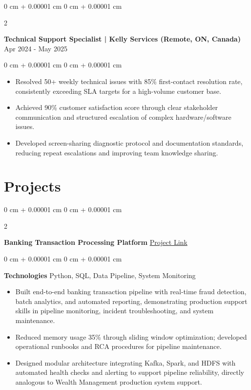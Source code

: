 \documentclass[10pt, letterpaper]{article}
\newenvironment{highlights}{
    \begin{itemize}[
        topsep=0.10 cm,
        parsep=0.10 cm,
        partopsep=0pt,
        itemsep=0pt,
        leftmargin=0 cm + 10pt
    ]
}{
    \end{itemize}
} %
\newenvironment{onecolentry}{
    \begin{adjustwidth}{
        0 cm + 0.00001 cm
    }{
        0 cm + 0.00001 cm
    }
}{
    \end{adjustwidth}
} %
\newenvironment{twocolentry}[2][]{
    \onecolentry
    \def\secondColumn{#2}
    \setcolumnwidth{\fill, 4.5 cm}
    \begin{paracol}{2}
}{
    \switchcolumn \raggedleft \secondColumn
    \end{paracol}
    \endonecolentry
} %
\begin{document}
        \begin{twocolentry}{
            {Apr 2024 - May 2025}
        }
            \textbf{Technical Support Specialist | Kelly Services (Remote, ON, Canada)}\end{twocolentry}
        \vspace{0.10 cm}
        \begin{onecolentry}
            \begin{highlights}
                \item Resolved 50+ weekly technical issues with 85\% first-contact resolution rate, consistently exceeding SLA targets for a high-volume customer base.
                \item Achieved 90\% customer satisfaction score through clear stakeholder communication and structured escalation of complex hardware/software issues.
                \item Developed screen-sharing diagnostic protocol and documentation standards, reducing repeat escalations and improving team knowledge sharing.
            \end{highlights}
        \end{onecolentry}

    \section{Projects}

        \begin{twocolentry}{
            \href{https://github.com/hpk369/bank-platform}{Project Link}
        }
            \textbf{Banking Transaction Processing Platform}\end{twocolentry}
        \vspace{0.10 cm}
        \begin{onecolentry}
            \textbf{Technologies} \> Python, SQL, Data Pipeline, System Monitoring
            \begin{highlights}
                \item Built end-to-end banking transaction pipeline with real-time fraud detection, batch analytics, and automated reporting, demonstrating production support skills in pipeline monitoring, incident troubleshooting, and system maintenance. 
                \item Reduced memory usage 35\% through sliding window optimization; developed operational runbooks and RCA procedures for pipeline maintenance. 
                \item Designed modular architecture integrating Kafka, Spark, and HDFS with automated health checks and alerting to support pipeline reliability, directly analogous to Wealth Management production system support.
            \end{highlights}
        \end{onecolentry}
\end{document}
